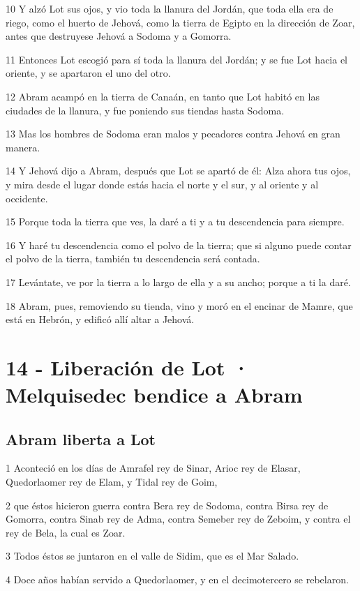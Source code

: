 10 Y alzó Lot sus ojos, y vio toda la llanura del Jordán, que toda ella era de riego, como el huerto de Jehová, como la tierra de Egipto en la dirección de Zoar, antes que destruyese Jehová a Sodoma y a Gomorra.

11 Entonces Lot escogió para sí toda la llanura del Jordán; y se fue Lot hacia el oriente, y se apartaron el uno del otro.

12 Abram acampó en la tierra de Canaán, en tanto que Lot habitó en las ciudades de la llanura, y fue poniendo sus tiendas hasta Sodoma.

13 Mas los hombres de Sodoma eran malos y pecadores contra Jehová en gran manera.

14 Y Jehová dijo a Abram, después que Lot se apartó de él: Alza ahora tus ojos, y mira desde el lugar donde estás hacia el norte y el sur, y al oriente y al occidente.

15 Porque toda la tierra que ves, la daré a ti y a tu descendencia para siempre.

16 Y haré tu descendencia como el polvo de la tierra; que si alguno puede contar el polvo de la tierra, también tu descendencia será contada.

17 Levántate, ve por la tierra a lo largo de ella y a su ancho; porque a ti la daré.

18 Abram, pues, removiendo su tienda, vino y moró en el encinar de Mamre, que está en Hebrón, y edificó allí altar a Jehová.

\chapter{14 - Liberación de Lot · Melquisedec bendice a Abram}

\section{Abram liberta a Lot}

1 Aconteció en los días de Amrafel rey de Sinar, Arioc rey de Elasar, Quedorlaomer rey de Elam, y Tidal rey de Goim,

2 que éstos hicieron guerra contra Bera rey de Sodoma, contra Birsa rey de Gomorra, contra Sinab rey de Adma, contra Semeber rey de Zeboim, y contra el rey de Bela, la cual es Zoar.

3 Todos éstos se juntaron en el valle de Sidim, que es el Mar Salado.

4 Doce años habían servido a Quedorlaomer, y en el decimotercero se rebelaron.

